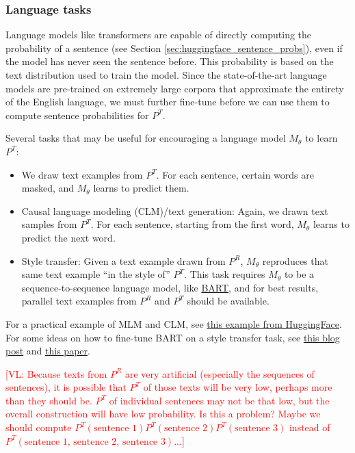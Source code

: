\documentclass{article}
\newcommand{\vl}[1]{\textcolor{red}{[VL: #1]}}
\begin{document}
	\subsubsection{Language tasks}
	
	Language models like transformers are capable of directly computing the probability of a sentence (see Section \ref{sec:huggingface_sentence_probs}), even if the model has never seen the sentence before. This probability is based on the text distribution used to train the model. Since the state-of-the-art language models are pre-trained on extremely large corpora that approximate the entirety of the English language, we must further fine-tune before we can use them to compute sentence probabilities for $P^T$.
	
	Several tasks that may be useful for encouraging a language model $M_\theta$ to learn $P^T$:
	\begin{itemize}
		\item We draw text examples from $P^T$. For each sentence, certain words are masked, and $M_\theta$ learns to predict them.
		\item Causal language modeling (CLM)/text generation: Again, we drawn text samples from $P^T$. For each sentence, starting from the first word, $M_\theta$ learns to predict the next word.
		\item Style transfer: Given a text example drawn from $P^R$, $M_\theta$ reproduces that same text example ``in the style of'' $P^T$. This task requires $M_\theta$ to be a sequence-to-sequence language model, like \href{https://arxiv.org/pdf/1910.13461.pdf}{BART}, and for best results, parallel text examples from $P^R$ and $P^T$ should be available.
	\end{itemize}
	
	For a practical example of MLM and CLM, see \href{https://huggingface.co/docs/transformers/tasks/language_modeling}{this example from HuggingFace}. For some ideas on how to fine-tune BART on a style transfer task, see \href{https://blog.fastforwardlabs.com/2022/05/05/neutralizing-subjectivity-bias-with-huggingface-transformers.html}{this blog post} and \href{https://arxiv.org/pdf/2105.06947.pdf}{this paper}.
	
	\vl{Because texts from $P^R$ are very artificial (especially the sequences of sentences), it is possible that $P^T$ of those texts will be very low, perhaps more than they should be. $P^T$ of individual sentences may not be that low, but the overall construction will have low probability. Is this a problem? Maybe we should compute $P^T(\text{sentence 1})P^T(\text{sentence 2})P^T(\text{sentence 3})$ instead of $P^T(\text{sentence 1, sentence 2, sentence 3})$...}
	
\end{document}
